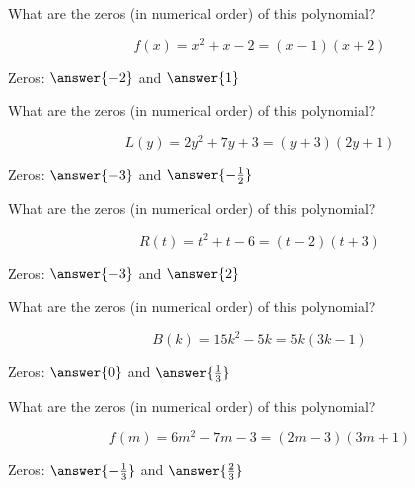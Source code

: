 \documentclass{ximera}
\author{Lee Wayand}
\begin{document}
\begin{exercise}








\begin{question}


What are the zeros (in numerical order) of this polynomial?

\[
f(x) = x^2 + x - 2 = (x-1)(x+2)
\]


Zeros:  $\answer{-2}$ and $\answer{1}$

\end{question}





\begin{question}


What are the zeros (in numerical order) of this polynomial?

\[
L(y) = 2y^2 + 7y + 3 = (y+3)(2y+1)
\]

Zeros:  $\answer{-3}$ and $\answer{-\frac{1}{2}}$

\end{question}





\begin{question}


What are the zeros (in numerical order) of this polynomial?

\[
R(t) = t^2 + t - 6 = (t-2)(t+3)
\]

Zeros:  $\answer{-3}$ and $\answer{2}$

\end{question}





\begin{question}


What are the zeros (in numerical order) of this polynomial?

\[
B(k) = 15k^2 - 5k = 5k (3k - 1)
\]

Zeros:  $\answer{0}$ and $\answer{\frac{1}{3}}$

\end{question}








\begin{question}


What are the zeros (in numerical order) of this polynomial?

\[
f(m) = 6m^2 -7m - 3 = (2m - 3)(3m + 1)
\]

Zeros:  $\answer{-\frac{1}{3}}$ and $\answer{\frac{2}{3}}$

\end{question}












\end{exercise}
\end{document}
